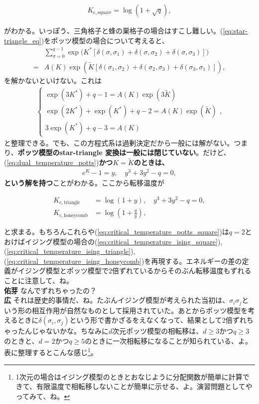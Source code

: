 \documentclass[paper=b5j,fontsize=12Q,jafontsize=12Q,baselineskip=21Q]{jlreq}
\DeclareRobustCommand{\hiron}{\textbf{広 }}
\DeclareRobustCommand{\umen}{\textbf{佑芽 }}
\begin{document}
\begin{refsection}
\begin{tcolorbox}
\begin{align}
  K_{\mathrm{c,square}}=\log\left(1+\sqrt q\right),\label{eq:critical_temperature_potts_square}
\end{align}
\end{tcolorbox}
がわかる。いっぽう、三角格子と蜂の巣格子の場合はすこし難しい。(\ref{eq:star-triangle_eq})をポッツ模型の場合について考えると、
\begin{align}
  &\sum_{\sigma=0}^{q-1}\exp\Big(K^\ast\left[\delta(\sigma,\sigma_1)+\delta(\sigma,\sigma_2)+\delta(\sigma,\sigma_3)\right]\Big)\\
  =&A(K)\exp\left(\tilde K\left[\delta(\sigma_1,\sigma_2)+\delta(\sigma_2,\sigma_3)+\delta(\sigma_3,\sigma_1)\right]\right),
\end{align}
を解かないといけない。これは
\begin{align}
  \begin{cases}
    \exp(3K^\ast)+q-1=A(K)\exp(3\tilde K)\\
    \exp(2K^\ast)+\exp(K^\ast)+q-2=A(K)\exp(\tilde K)\\
    3\exp(K^\ast)+q-3=A(K)
  \end{cases},
\end{align}
と整理できる。でも、この方程式系は過剰決定だから一般には解がない。つまり、\textbf{ポッツ模型のstar-triangle 変換は一般には閉じていない}。だけど、(\ref{eq:dual_temperature_potts})\textbf{かつ$K=\tilde K$のときは、}
\begin{align}
  e^K-1=y,\quad y^3+3y^2-q=0,
\end{align}
\textbf{という解を持つ}ことがわかる。ここから転移温度が
\begin{tcolorbox}
\begin{align}
  K_{\mathrm{c,triangle}}&=\log(1+y),\quad y^3+3y^2-q=0,\\
  K_{\mathrm{c,honeycomb}}&=\log\left(1+\frac qy\right),
\end{align}
\end{tcolorbox}
と求まる。もちろんこれらや(\ref{eq:critical_temperature_potts_square})は$q=2$とおけばイジング模型の場合の(\ref{eq:critical_temperature_ising_square}), (\ref{eq:critical_temperature_ising_triangle}), (\ref{eq:critical_temperature_ising_honeycomb})を再現する。エネルギーの差の定義がイジング模型とポッツ模型で2倍ずれているからそのぶん転移温度もずれることに注意して、ね。
\\\umen なんでずれちゃったの？
\\\hiron それは歴史的事情だ、ね。たぶんイジング模型が考えられた当初は、$\sigma_i\sigma_j$という形の相互作用が自然なものとして採用されていた。あとからポッツ模型を考えるときに$\delta(\sigma_i,\sigma_j)$という形で書かざるをえなくなって、結果として2倍ずれちゃったんじゃないかな。ちなみに$d$次元ポッツ模型の相転移は、$d\ge3$かつ$q\ge3$のときと、$d=2$かつ$q\ge5$のときに一次相転移になることが知られている、よ。表に整理するとこんな感じ\footnote{1次元の場合はイジング模型のときとおなじように分配関数が簡単に計算できて、有限温度で相転移しないことが簡単に示せる、よ。演習問題としてやってみて、ね。}。


\end{refsection}
\end{document}
